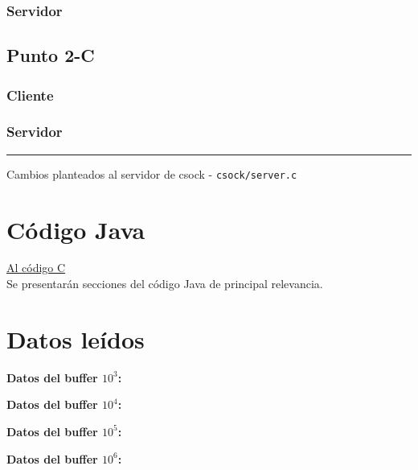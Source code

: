 \documentclass[12pt,journal,compsoc]{IEEEtran}
\begin{document}


\subsubsection{Servidor}



\subsection{Punto 2-C}
\label{punto2c}

\subsubsection{Cliente}



\subsubsection{Servidor}



\noindent\rule{\textwidth}{1pt}

\noindent
Cambios planteados al servidor de csock - \texttt{csock/server.c}\\



\section{Código Java}
\hyperref[appendixA]{Al código C}\\
Se presentarán secciones del código Java de principal relevancia.


\section{Datos leídos}
\label{appendixC}

\textbf{Datos del buffer $10^{3}$:}


\noindent \textbf{Datos del buffer $10^{4}$:}


\noindent \textbf{Datos del buffer $10^{5}$:}


\noindent \textbf{Datos del buffer $10^{6}$:}


\ifCLASSOPTIONcaptionsoff
  \newpage
\fi
\end{document}
